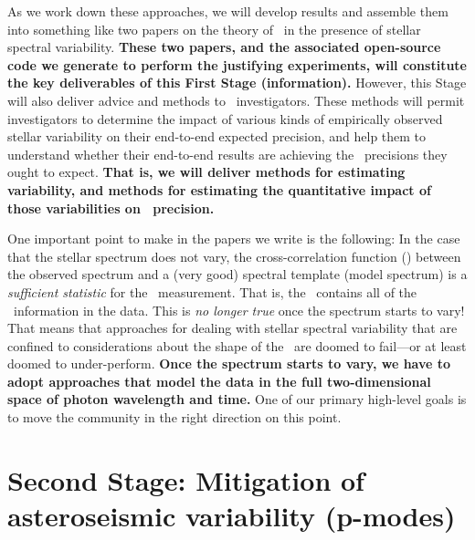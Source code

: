 \documentclass[12pt, letterpaper]{article}
\begin{document}
\noindent
As we work down these approaches, we will develop results and assemble them
into something like two papers on the theory of \EPRV\ in the presence of
stellar spectral variability. \textbf{These two papers, and the associated open-source
code we generate to perform the justifying experiments, will constitute the
key deliverables of this First Stage (information).}
However, this Stage will also deliver advice and methods to
\EPRV\ investigators.
These methods will permit investigators to determine the impact of
various kinds of empirically observed stellar variability on their
end-to-end expected precision,
and help them to understand whether their end-to-end results are
achieving the \RV\ precisions they ought to expect.
\textbf{That is, we will deliver methods for estimating variability, and methods
for estimating the quantitative impact of those variabilities on \RV\ precision.}

One important point to make in the papers we write is the following:
In the case that the stellar spectrum does not vary, the
cross-correlation function (\CCF) between the observed spectrum and a
(very good) spectral template (model spectrum) is a \emph{sufficient
  statistic} for the \RV\ measurement.
That is, the \CCF\ contains all of the \RV\ information in the data.
This is \emph{no longer true} once the spectrum starts to vary!
That means that approaches for dealing with stellar spectral variability
that are confined to considerations about the shape of the \CCF\ are
doomed to fail---or at least doomed to under-perform.
\textbf{Once the spectrum starts to vary, we have to adopt approaches that model
the data in the full two-dimensional space of photon wavelength and time.}
One of our primary high-level goals is to move the community in the
right direction on this point.

\section{Second Stage: Mitigation of asteroseismic variability (p-modes)}
\end{document}
